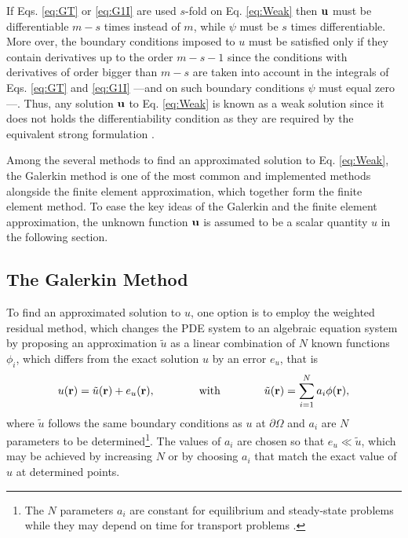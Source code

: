 %
If  Eqs. \eqref{eq:GT} or \eqref{eq:G1I} are used $s$-fold on Eq. \eqref{eq:Weak} then $\vb{u}$ must be differentiable $m-s$ times instead of $m$, while $\psi$ must be $s$ times differentiable. More over, the boundary conditions imposed to $u$ must be satisfied only if they contain  derivatives up to the order $m-s-1$ since the conditions with derivatives of order bigger than $m-s$ are taken into account in the integrals of Eqs. \eqref{eq:GT} and \eqref{eq:G1I} ---and on such boundary conditions $\psi$ must equal zero---. Thus, any solution $\vb{u}$ to Eq. \eqref{eq:Weak} is known as a weak solution  since it does not holds the differentiability condition as they are required by the equivalent strong formulation \cite{dhatt_finite_2012}.

Among the several methods to find an approximated solution to Eq. \eqref{eq:Weak}, the Galerkin method is one of the most common and implemented methods alongside the finite element approximation, which together form the finite element method. To ease the key ideas of the Galerkin and the finite element approximation, the unknown function $\vb{u}$ is assumed to be a scalar quantity $u$ in the following section.

    \subsection{The Galerkin Method}

    To find an approximated solution to $u$, one option is to employ the weighted residual method, which changes the PDE system to an algebraic equation system by proposing an approximation  $\tilde{u}$ as a linear combination of $N$ known functions  $\phi_i$, which differs from the exact solution $u$ by an error $e_{u}$, that is \cite{dhatt_finite_2012,larson_finite_2013,fletcher_computational_1984}
     \begin{align}
        {u}(\vb{r}) = \tilde{{u}}(\vb{r}) + e_{{u}}(\vb{r}),
            \qquad\qquad
            \text{with}
            \qquad\qquad
        \tilde{{u}}(\vb{r}) = \sum_{i = 1}^{N} {a}_i\phi(\vb{r}),
     \label{eq:uapprox}
     \end{align}
     where $\tilde{{u}}$ follows the same boundary conditions as ${u}$ at $\partial\Omega$ and ${a}_i$ are $N$ parameters to be determined\footnote{The $N$ parameters ${a}_i$ are constant for equilibrium and steady-state problems while they may depend on time for transport problems \cite{dhatt_finite_2012}.}. The values of ${a}_i$ are chosen so that $e_{{u}}\ll  \tilde{u} $, which may be achieved by increasing $N$ or by choosing ${a}_i$ that match the exact value of ${u}$ at determined points.

